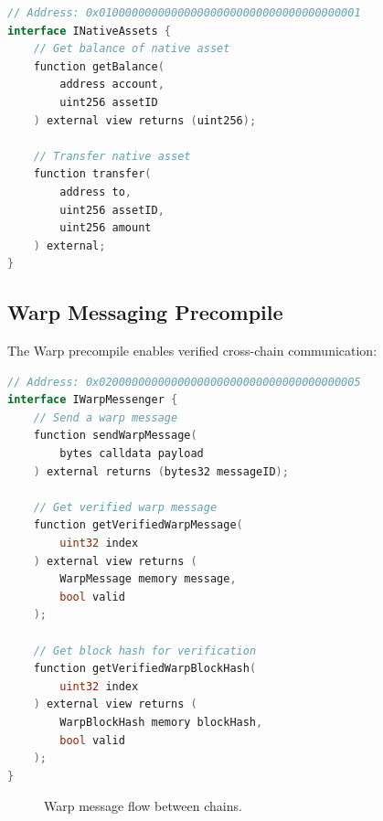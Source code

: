 \documentclass[11pt,letterpaper]{article}
\begin{document}
\begin{lstlisting}[language=Go, caption=Native Asset Interface]
// Address: 0x0100000000000000000000000000000000000001
interface INativeAssets {
    // Get balance of native asset
    function getBalance(
        address account,
        uint256 assetID
    ) external view returns (uint256);

    // Transfer native asset
    function transfer(
        address to,
        uint256 assetID,
        uint256 amount
    ) external;
}
\end{lstlisting}

\subsection{Warp Messaging Precompile}

The Warp precompile enables verified cross-chain communication:

\begin{lstlisting}[language=Go, caption=Warp Messaging Interface]
// Address: 0x0200000000000000000000000000000000000005
interface IWarpMessenger {
    // Send a warp message
    function sendWarpMessage(
        bytes calldata payload
    ) external returns (bytes32 messageID);

    // Get verified warp message
    function getVerifiedWarpMessage(
        uint32 index
    ) external view returns (
        WarpMessage memory message,
        bool valid
    );

    // Get block hash for verification
    function getVerifiedWarpBlockHash(
        uint32 index
    ) external view returns (
        WarpBlockHash memory blockHash,
        bool valid
    );
}
\end{lstlisting}

\begin{figure}[h]
\centering
{}
\caption{Warp message flow between chains.}
\label{fig:warp}
\end{figure}
\end{document}
